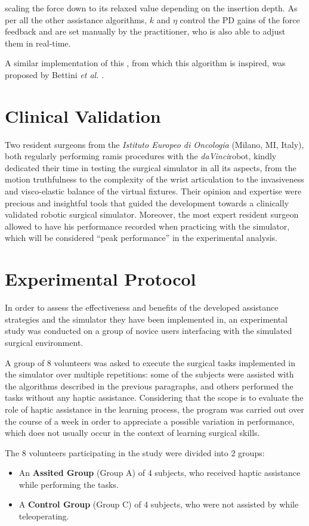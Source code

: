\documentclass[../main.tex]{subfiles}
\begin{document}
scaling the force down to its relaxed value depending on the insertion depth. As per all the other assistance algorithms, $k$ and $\eta$ control the PD gains of the force feedback and are set manually by the practitioner, who is also able to adjust them in real-time.

A similar implementation of this \vf, from which this algorithm is inspired, was proposed by Bettini \textit{et al.} \cite{Bettini2004}.

\section{Clinical Validation}
\label{sec:clinicalvalidation}
Two resident surgeons from the \textit{Istituto Europeo di Oncologia} (Milano, MI, Italy), both regularly performing \ac{ramis} procedures with the \textit{daVinci}\cright robot, kindly dedicated their time in testing the surgical simulator in all its aspects, from the motion truthfulness to the complexity of the wrist articulation to the invasiveness and visco-elastic balance of the virtual fixtures. Their opinion and expertise were precious and insightful tools that guided the development towards a clinically validated robotic surgical simulator. 
Moreover, the most expert resident surgeon allowed to have his performance recorded when practicing with the simulator, which will be considered ``peak performance'' in the experimental analysis. 

\section{Experimental Protocol}
In order to assess the effectiveness and benefits of the developed assistance strategies and the simulator they have been implemented in, an experimental study was conducted on a group of novice users interfacing with the simulated surgical environment. 

A group of 8 volunteers was asked to execute the surgical tasks implemented in the simulator over multiple repetitions: some of the subjects were assisted with the \vf algorithms described in the previous paragraphs, and others performed the tasks without any haptic assistance. Considering that the scope is to evaluate the role of haptic assistance in the learning process, the program was carried out over the course of a week in order to appreciate a possible variation in performance, which does not usually occur in the context of learning surgical skills.

The 8 volunteers participating in the study were divided into 2 groups:
\begin{itemize}
    \item An \textbf{Assited Group} (Group A) of 4 subjects, who received haptic assistance while performing the tasks.
    \item A \textbf{Control Group} (Group C) of 4 subjects, who were not assisted by \vfs while teleoperating.
\end{itemize}
\end{document}
